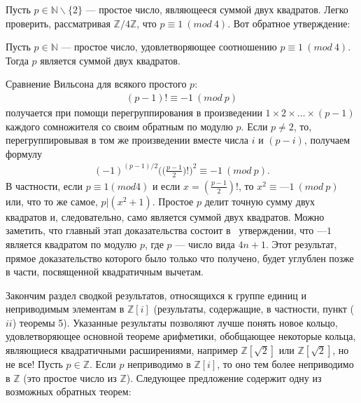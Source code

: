 \documentclass{../../template/mai_book}
\begin{document}
Пусть $p \in \mathds{N} \backslash \{2\}$ — простое число, являющееся суммой двух квадратов. Легко проверить, рассматривая $\mathds{Z}/4\mathds{Z}$, что $p \equiv 1\:(mod\:4)$. Вот обратное утверждение: 

\begin{sled}
\textit{\indent} Пусть $p \in \mathds{N}$ — простое число, удовлетворяющее соотношению $p \equiv 1\:(mod\:4)$. Тогда $p$ является суммой двух квадратов.
\end{sled}

\begin{myproof}
Сравнение Вильсона для всякого простого $p$:
\begin{align*}
(p - 1)!\equiv -1\:(mod\:p)
\end{align*}
получается при помощи перегруппирования в произведении $1 \times 2 \times \dots \times (p-1)$ каждого сомножителя со своим обратным по модулю $p$. Если $p \neq 2$, то, перегруппировывая в том же произведении вместе числа $i$ и $(p - i)$, получаем формулу
\begin{align*}
(-1)^{(p-1)/2} \Biggl(\Biggl(\frac{p-1}{2}\Biggr)!\Biggr)^2 \equiv -1\:(mod\:p)\text{.}
\end{align*}
В частности, если $p \equiv 1 (mod 4)$ и если $x = (\frac{p-1}{2})!$, то $x^2 \equiv —1\:(mod\:p)$ или, что то же самое, $p | (x^2 + 1)$. Простое $p$ делит точную сумму двух квадратов и, следовательно, само является суммой двух квадратов. \newline Можно заметить, что главный этап доказательства состоит в~ утверждении, что $—1$ является квадратом по модулю $p$, где $p$ — число вида $4n + 1$. Этот результат, прямое доказательство которого было только что получено, будет углублен позже в части, посвященной квадратичным вычетам.
\end{myproof}

\newpage

Закончим раздел сводкой результатов, относящихся к группе единиц и неприводимым элементам в $\mathds{Z}[i]$ (результаты, содержащие, в частности, пункт ($ii$) теоремы 5). Указанные результаты позволяют лучше понять новое кольцо, удовлетворяющее основной теореме арифметики, обобщающее некоторые кольца, являющиеся квадратичными расширениями, например $\mathds{Z}[\sqrt{2}]$ или $\mathds{Z}[\sqrt{2}]$, но не все! \newline \indent Пусть $p \in \mathds{Z}$. Если $p$ неприводимо в $\mathds{Z}[i]$, то оно тем более неприводимо в $\mathds{Z}$ (это простое число из $\mathds{Z}$). Следующее предложение содержит одну из возможных обратных теорем:
\end{document}
